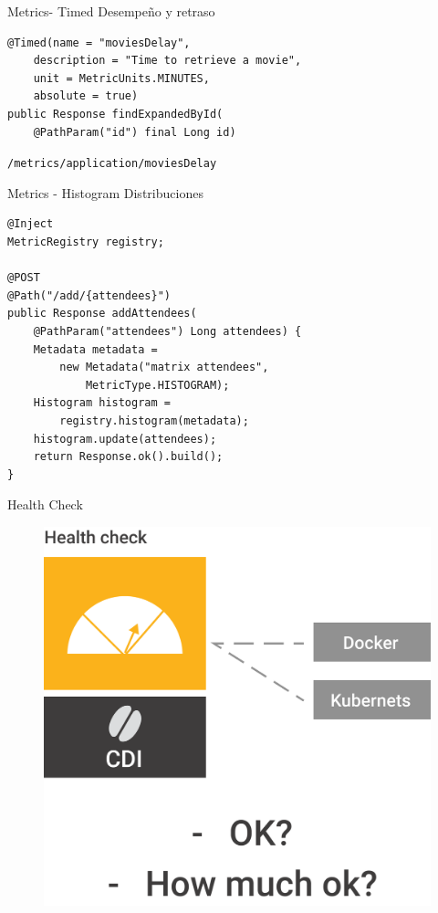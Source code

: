 \documentclass[aspectratio=169]{beamer}
\begin{document}
\begin{frame}[fragile]{Metrics- Timed}
Desempeño y retraso
\begin{lstlisting}
@Timed(name = "moviesDelay",
    description = "Time to retrieve a movie",
    unit = MetricUnits.MINUTES,
    absolute = true)
public Response findExpandedById(
    @PathParam("id") final Long id)
\end{lstlisting}

\lstinline|/metrics/application/moviesDelay|
\end{frame}

\begin{frame}[fragile]{Metrics - Histogram}
Distribuciones
\begin{lstlisting}
@Inject
MetricRegistry registry;

@POST
@Path("/add/{attendees}")
public Response addAttendees(
    @PathParam("attendees") Long attendees) {
    Metadata metadata =
        new Metadata("matrix attendees",
            MetricType.HISTOGRAM);
    Histogram histogram =
        registry.histogram(metadata);
    histogram.update(attendees);
    return Response.ok().build();
}
\end{lstlisting}

\end{frame}

\begin{frame}{Health Check}
\begin{figure}
	\centering
	\includegraphics[width=0.75\linewidth]{Images/healthcheck}
\end{figure}
\end{frame}
\end{document}
